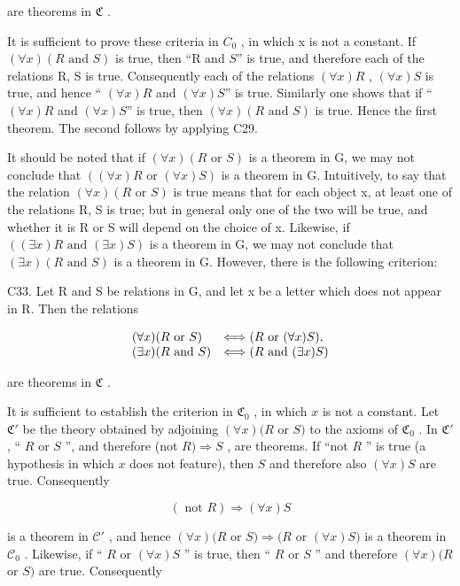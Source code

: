 are theorems in \(\mathfrak{C}\) .

It is sufficient to prove these criteria in \(C_{0}\) , in which x is not a constant. If \((\forall x)(R \text{ and } S)\) is true, then ``R and \(S\)'' is true, and therefore each of the relations R, S is true. Consequently each of the relations \((\forall x)R\) , \((\forall x)S\) is true, and hence `` \((\forall x)R\) and \((\forall x)S\)'' is true. Similarly one shows that if `` \((\forall x)R\) and \((\forall x)S\)'' is true, then \((\forall x)(R \text{ and } S)\) is true. Hence the first theorem. The second follows by applying C29.

It should be noted that if \((\forall x)(R \text{ or } S)\) is a theorem in G, we may not conclude that \(((\forall x)R \text{ or } (\forall x)S)\) is a theorem in G. Intuitively, to say that the relation \((\forall x)(R \text{ or } S)\) is true means that for each object x, at least one of the relations R, S is true; but in general only one of the two will be true, and whether it is R or S will depend on the choice of x. Likewise, if \(((\exists x)R \text{ and } (\exists x)S)\) is a theorem in G, we may not conclude that \((\exists x)(R \text{ and } S)\) is a theorem in G. However, there is the following criterion:

C33. Let R and S be relations in G, and let x be a letter which does not appear in R. Then the relations

\[
\begin{array}{l l} (\forall x) (R \text {   or   } S) & \Longleftrightarrow (R \text {   or   } (\forall x) S), \\ (\exists x) (R \text {   and   } S) & \Longleftrightarrow (R \text {   and   } (\exists x) S) \end{array}
\]

are theorems in \(\mathfrak{C}\) .

It is sufficient to establish the criterion in \(\mathfrak{C}_0\) , in which \(x\) is not a constant. Let \(\mathfrak{C}'\) be the theory obtained by adjoining \((\forall x)(R\) or \(S)\) to the axioms of \(\mathfrak{C}_0\) . In \(\mathfrak{C}'\) , `` \(R\) or \(S\) '', and therefore (not \(R) \Longrightarrow S\) , are theorems. If ``not \(R\) '' is true (a hypothesis in which \(x\) does not feature), then \(S\) and therefore also \((\forall x)S\) are true. Consequently

\[
(\text { not } R) \Longrightarrow (\forall x) S
\]

is a theorem in \(\mathcal{C}'\) , and hence \((\forall x)(R\) or \(S) \Longrightarrow (R\) or \((\forall x)S)\) is a theorem in \(\mathcal{C}_0\) . Likewise, if `` \(R\) or \((\forall x)S\) '' is true, then `` \(R\) or \(S\) '' and therefore \((\forall x)(R\) or \(S)\) are true. Consequently

